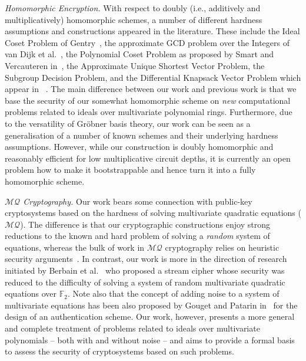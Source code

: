 \documentclass[draft]{llncs}
\newcommand{\ring}[1]{\mathbb{#1}}
\newcommand{\F}{\ensuremath{\ring{F}}\xspace}
\begin{document}
{\it Homomorphic Encryption.} With respect to doubly (i.e., additively and multiplicatively) homomorphic schemes, a number of different hardness assumptions and constructions appeared in the literature. These include the Ideal Coset Problem of Gentry~\cite{Gen09}, the approximate GCD problem over the Integers of van Dijk et al.~\cite{DGHV10}, the Polynomial Coset Problem as proposed by Smart and Vercauteren in~\cite{SV10}, the Approximate Unique Shortest Vector Problem, the Subgroup Decision Problem, and the Differential Knapsack Vector Problem which appear in ~\cite{MelGH10}.
The main difference between our work and previous work is that we base the security of our somewhat homomorphic scheme on {\em new} computational problems related to ideals over multivariate polynomial rings. Furthermore, due to the versatility of Gröbner basis theory, our work can be seen as a generalisation of a number of known schemes and their underlying hardness assumptions. However, while our construction is doubly homomorphic and reasonably efficient for low multiplicative circuit depths, it is currently an open problem how to make it bootstrappable and hence turn it into a fully homomorphic scheme.

{\it $\mathcal{MQ}$ Cryptography.} Our work bears some connection with public-key cryptosystems based on the hardness of solving multivariate quadratic equations ($\mathcal{MQ}$). The difference is that our cryptographic constructions enjoy strong reductions to the known and hard problem of solving a \emph{random} system of equations, whereas the bulk of work in $\mathcal{MQ}$ cryptography relies on heuristic security arguments~\cite{DingYangSurvey}. In contrast, our work is more in the direction of research initiated by Berbain et al.~\cite{DBLP:journals/jsc/BerbainGP09} who proposed a stream cipher whose security was reduced to the difficulty of solving a system of random multivariate quadratic equations over $\F_2$. Note also that the concept of adding noise to a system of multivariate equations has been also proposed by Gouget and Patarin in~\cite{DBLP:conf/vietcrypt/GougetP06} for the design of an authentication scheme. Our work, however, presents a more general and complete treatment of problems related to ideals over multivariate polynomials -- both with and without noise -- and aims to provide a formal basis to assess the security of cryptosystems based on such problems.
\end{document}
